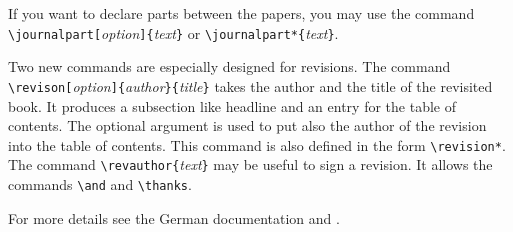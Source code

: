 If you want to declare parts between the papers, you may use the command
\verb|\journalpart[|\emph{option}\verb|]{|\emph{text}\verb|}| or
\verb|\journalpart*{|\emph{text}\verb|}|.

Two new commands are especially designed for revisions. The command
\verb|\revison[|\emph{option}\verb|]{|\emph{author}\verb|}{|\emph{title}\verb|}|
takes the author and the title of the revisited book.  It produces a
subsection like headline and an entry for the table of contents. The
optional argument is used to put also the author of the revision into
the table of contents. This command is also defined in the form
\verb|\revision*|. The command \verb|\revauthor{|\emph{text}\verb|}|
may be useful to sign a revision. It allows the commands \verb|\and|
and \verb|\thanks|.


\iflocalin
For more details see the German documentation
 and .
\fi

